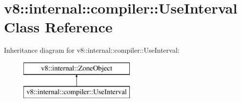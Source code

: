 \hypertarget{classv8_1_1internal_1_1compiler_1_1_use_interval}{}\section{v8\+:\+:internal\+:\+:compiler\+:\+:Use\+Interval Class Reference}
\label{classv8_1_1internal_1_1compiler_1_1_use_interval}
Inheritance diagram for v8\+:\+:internal\+:\+:compiler\+:\+:Use\+Interval\+:\begin{figure}[H]
\begin{center}
\leavevmode
\includegraphics[height=2.000000cm]{classv8_1_1internal_1_1compiler_1_1_use_interval}
\end{center}
\end{figure}
